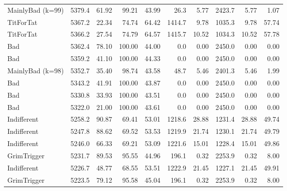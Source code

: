 \documentclass[journal,a4paper,10pt,twoside]{IEEEtran} %
\begin{document}
\begin{table}[ht]
\begin{tabular}{l|rrrr|rrrrr}
		MainlyBad (k=99)  & 5379.4 & 61.92 &     99.21 &    43.99 &   26.3 &                   5.77 & 2423.7 &                    5.77 &   1.07 \\
		TitForTat         & 5367.2 & 22.34 &     74.74 &    64.42 & 1414.7 &                   9.78 & 1035.3 &                    9.78 &  57.74 \\
		TitForTat         & 5366.2 & 27.54 &     74.79 &    64.57 & 1415.7 &                  10.52 & 1034.3 &                   10.52 &  57.78 \\
		Bad               & 5362.4 & 78.10 &    100.00 &    44.00 &    0.0 &                   0.00 & 2450.0 &                    0.00 &   0.00 \\
		Bad               & 5359.2 & 41.10 &    100.00 &    44.33 &    0.0 &                   0.00 & 2450.0 &                    0.00 &   0.00 \\
		MainlyBad (k=98)  & 5352.7 & 35.40 &     98.74 &    43.58 &   48.7 &                   5.46 & 2401.3 &                    5.46 &   1.99 \\
		Bad               & 5343.2 & 41.91 &    100.00 &    43.87 &    0.0 &                   0.00 & 2450.0 &                    0.00 &   0.00 \\
		Bad               & 5330.8 & 33.93 &    100.00 &    43.51 &    0.0 &                   0.00 & 2450.0 &                    0.00 &   0.00 \\
		Bad               & 5322.0 & 21.00 &    100.00 &    43.61 &    0.0 &                   0.00 & 2450.0 &                    0.00 &   0.00 \\
		Indifferent       & 5258.2 & 90.87 &     69.41 &    53.01 & 1218.6 &                  28.88 & 1231.4 &                   28.88 &  49.74 \\
		Indifferent       & 5247.8 & 88.62 &     69.52 &    53.53 & 1219.9 &                  21.74 & 1230.1 &                   21.74 &  49.79 \\
		Indifferent       & 5246.0 & 66.33 &     69.21 &    53.09 & 1221.6 &                  15.01 & 1228.4 &                   15.01 &  49.86 \\
		GrimTrigger       & 5231.7 & 89.53 &     95.55 &    44.96 &  196.1 &                   0.32 & 2253.9 &                    0.32 &   8.00 \\
		Indifferent       & 5226.7 & 48.77 &     68.55 &    53.51 & 1222.9 &                  21.45 & 1227.1 &                   21.45 &  49.91 \\
		GrimTrigger       & 5223.5 & 79.12 &     95.58 &    45.04 &  196.1 &                   0.32 & 2253.9 &                    0.32 &   8.00 \\

\end{tabular}
\end{table}
\end{document}
